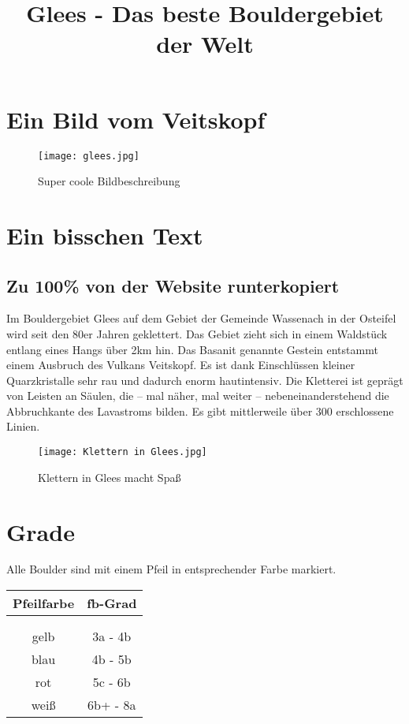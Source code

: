 \documentclass{article}%
\title{Glees {-} Das beste Bouldergebiet der Welt}%
\begin{document}
%
\normalsize%
\maketitle%
\section{Ein Bild vom Veitskopf}%
\label{sec:EinBildvomVeitskopf}%


\begin{figure}[h!]%
\centering%
\texttt{[image: glees.jpg]}%
\caption{Super coole Bildbeschreibung}%
\end{figure}

%
\section{Ein bisschen Text}%
\label{sec:EinbisschenText}%
\subsection{Zu 100\% von der Website runterkopiert}%
\label{subsec:Zu100vonderWebsiterunterkopiert}%
Im Bouldergebiet Glees auf dem Gebiet der Gemeinde Wassenach in der Osteifel wird seit den 80er Jahren geklettert. Das Gebiet zieht sich in einem Waldstück entlang eines Hangs über 2km hin.\newline%
Das Basanit genannte Gestein entstammt einem Ausbruch des Vulkans Veitskopf. Es ist dank Einschlüssen kleiner Quarzkristalle sehr rau und dadurch enorm hautintensiv. Die Kletterei ist geprägt von Leisten an Säulen, die – mal näher, mal weiter – nebeneinanderstehend die Abbruchkante des Lavastroms bilden. Es gibt mittlerweile über 300 erschlossene Linien.

%


\begin{figure}[h!]%
\centering%
\texttt{[image: Klettern in Glees.jpg]}%
\caption{Klettern in Glees macht Spaß}%
\end{figure}

%
\section{Grade}%
\label{sec:Grade}%
Alle Boulder sind mit einem Pfeil in entsprechender Farbe markiert.%
\begin{longtable}{c c}%
\hline%
Pfeilfarbe&fb{-}Grad\\%
\hline%
\endhead%
\hline%
\multicolumn{2}{c}{}\\%
\hline%
\endfoot%
\hline%
\multicolumn{2}{c}{}\\%
\hline%
\endlastfoot%
gelb&3a {-} 4b\\%
blau&4b {-} 5b\\%
rot&5c {-} 6b\\%
weiß&6b+ {-} 8a\\%
\end{longtable}
\end{document}
